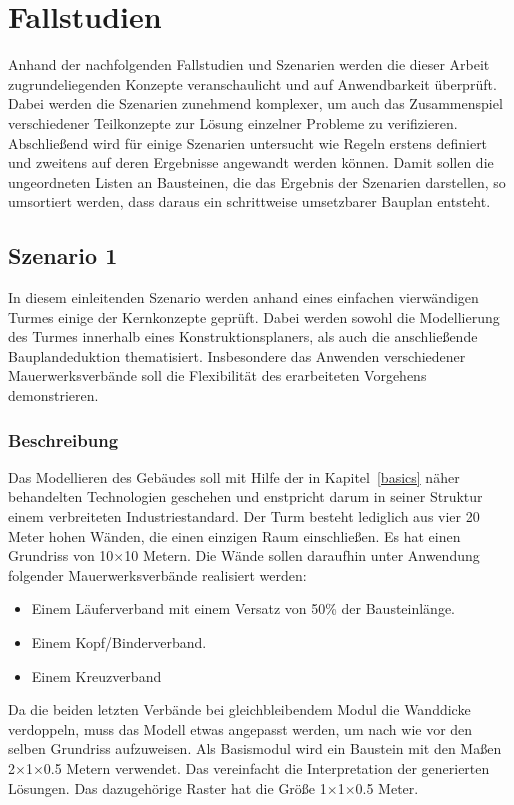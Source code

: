 \chapter{Fallstudien}\label{scenarios}
Anhand der nachfolgenden Fallstudien und Szenarien werden die dieser Arbeit zugrundeliegenden Konzepte veranschaulicht und auf Anwendbarkeit überprüft.
Dabei werden die Szenarien zunehmend komplexer, um auch das Zusammenspiel verschiedener Teilkonzepte zur Lösung einzelner Probleme zu verifizieren.
Abschließend wird für einige Szenarien untersucht wie Regeln erstens definiert und zweitens auf deren Ergebnisse angewandt werden können.
Damit sollen die ungeordneten Listen an Bausteinen, die das Ergebnis der Szenarien darstellen, so umsortiert werden, dass daraus ein schrittweise umsetzbarer Bauplan entsteht.

\section{Szenario 1}\label{scenarios:scenario1}
In diesem einleitenden Szenario werden anhand eines einfachen vierwändigen Turmes einige der Kernkonzepte geprüft.
Dabei werden sowohl die Modellierung des Turmes innerhalb eines Konstruktionsplaners, als auch die anschließende Bauplandeduktion thematisiert.
Insbesondere das Anwenden verschiedener Mauerwerksverbände soll die Flexibilität des erarbeiteten Vorgehens demonstrieren.
\subsection*{Beschreibung}
Das Modellieren des Gebäudes soll mit Hilfe der in Kapitel~\ref{basics} näher behandelten Technologien geschehen und enstpricht darum in seiner Struktur einem verbreiteten Industriestandard.
Der Turm besteht lediglich aus vier 20 Meter hohen Wänden, die einen einzigen Raum einschließen.
Es hat einen Grundriss von 10$\times$10 Metern.
Die Wände sollen daraufhin unter Anwendung folgender Mauerwerksverbände realisiert werden:
\begin{itemize}
  \item Einem Läuferverband mit einem Versatz von 50\% der Bausteinlänge.
  \item Einem Kopf/Binderverband.
  \item Einem Kreuzverband 
\end{itemize}
Da die beiden letzten Verbände bei gleichbleibendem Modul die Wanddicke verdoppeln, muss das Modell etwas angepasst werden, um nach wie vor den selben Grundriss aufzuweisen.
Als Basismodul wird ein Baustein mit den Maßen 2$\times$1$\times$0.5 Metern verwendet.
Das vereinfacht die Interpretation der generierten Lösungen.
Das dazugehörige Raster hat die Größe 1$\times$1$\times$0.5 Meter.

